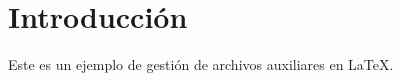 \documentclass{article}
\begin{document}

\tableofcontents %

\section{Introducción}
Este es un ejemplo de gestión de archivos auxiliares en LaTeX.
\end{document}
